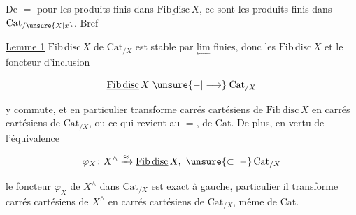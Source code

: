 
De $=$ pour les produits  finis dans  $\underline{\mathrm{Fib\,disc}}\,X$, ce sont les produits finis dans $\mathrm{Cat}_{/\unsure{X|x}}$. Bref

\uline{Lemme 1}    $\underline{\mathrm{Fib\,disc}}\,X$ de $\mathrm{Cat}_{/X}$ est stable par $\underset{\leftarrow}{\mathrm{lim}}$ finies, donc les   $\underline{\mathrm{Fib\,disc}}\,X$  et le foncteur d'inclusion

\[
\underline{\mathrm{Fib\,disc}}\,X\mathrel{\unsure{-|\longrightarrow}}\mathrm{Cat}_{/X}
\]

y commute, et en particulier transforme carrés cartésiens de $\underline{\mathrm{Fib\,disc}}\,X$ en carrés cartésiens de $\mathrm{Cat}_{/X}$, ou ce qui revient au $=$, de Cat. De plus, en vertu de l'équivalence

\[
\varphi_X\colon X^\wedge\xrightarrow{\approx}\underline{\mathrm{Fib\,disc}}\,X,\ \unsure{\subset|-}\,\mathrm{Cat}_{/X}
\]

le foncteur $\varphi_X$ de $X^\wedge$ dans $\mathrm{Cat}_{/X}$ est exact à gauche,  particulier il transforme carrés cartésiens de $X^\wedge$ en carrés cartésiens de $\mathrm{Cat}_{/X}$,  même de Cat.
